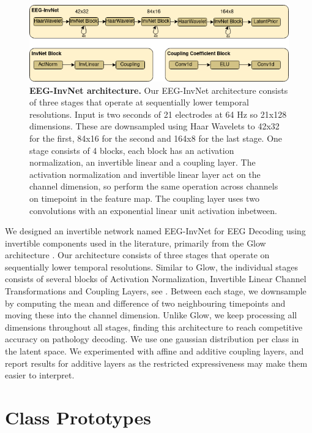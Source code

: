 \begin{figure}[htb]
    \myfloatalign
    \includegraphics[width=1\linewidth]{images/EEG-InvNet.png}
    \caption[EEG-InvNet architecture]{
\textbf{EEG-InvNet architecture.} Our EEG-InvNet architecture consists
of three stages that operate at sequentially lower temporal resolutions.
Input is two seconds of 21 electrodes at 64 Hz so 21x128 dimensions.
These are downsampled using Haar Wavelets to 42x32 for the first, 84x16
for the second and 164x8 for the last stage. One stage consists of 4
blocks, each block has an activation normalization, an invertible linear
and a coupling layer. The activation normalization and invertible linear
layer act on the channel dimension, so perform the same operation across
channels on timepoint in the feature map. The coupling layer uses two
convolutions with an exponential linear unit activation inbetween.
}
\label{eeg-invnet-fig}
\end{figure}




    We designed an invertible network named EEG-InvNet for EEG Decoding
using invertible components used in the literature, primarily from the
Glow architecture \citep{DBLP:conf/nips/KingmaD18}. Our
architecture consists of three stages that operate on sequentially lower
temporal resolutions. Similar to Glow, the individual stages consists of
several blocks of Activation Normalization, Invertible Linear Channel
Transformations and Coupling Layers, see
. Between each stage, we downsample by
computing the mean and difference of two neighbouring timepoints and
moving these into the channel dimension. Unlike Glow, we keep processing
all dimensions throughout all stages, finding this architecture to reach
competitive accuracy on pathology decoding. We use one gaussian
distribution per class in the latent space. We experimented with affine
and additive coupling layers, and report results for additive layers as
the restricted expressiveness may make them easier to interpret.

\section{Class Prototypes}\label{methods-class-prototypes}


